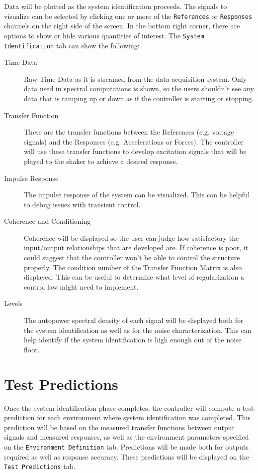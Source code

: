 \documentclass[pdf,12pt,report]{SANDreport}
\newcommand{\inlineCode}{\lstinline[basicstyle=\bfseries\ttfamily]}
\begin{document}
    Data will be plotted as the system identification proceeds.  The signals to visualize can be selected by clicking one or more of the \inlineCode{References} or \inlineCode{Responses} channels on the right side of the screen.  In the bottom right corner, there are options to show or hide various quantities of interest.  The \inlineCode{System Identification} tab can show the following:
    
    \begin{description}
        \item[Time Data] Raw Time Data as it is streamed from the data acquisition system.  Only data used in spectral computations is shown, so the users shouldn't see any data that is ramping up or down as if the controller is starting or stopping.
        \item[Transfer Function] These are the transfer functions between the References (e.g. voltage signals) and the Responses (e.g. Accelerations or Forces).  The controller will use these transfer functions to develop excitation signals that will be played to the shaker to achieve a desired response.
        \item[Impulse Response]  The impulse response of the system can be visualized.  This can be helpful to debug issues with transient control.
        \item[Coherence and Conditioning] Coherence will be displayed so the user can judge how satisfactory the input/output relationships that are developed are.  If coherence is poor, it could suggest that the controller won't be able to control the structure properly.
        The condition number of the Transfer Function Matrix is also displayed.  This can be useful to determine what level of regularization a control law might need to implement.
        \item[Levels] The autopower spectral density of each signal will be displayed both for the system identification as well as for the noise characterization.  This can help identify if the system identification is high enough out of the noise floor.
    \end{description}

    \section{Test Predictions}\label{sec:using_rattlesnake_test_predictions}
    Once the system identification phase completes, the controller will compute a test prediction for each environment where system identification was completed.  This prediction will be based on the measured transfer functions between output signals and measured responses, as well as the environment parameters specified on the \inlineCode{Environment Definition} tab.  Predictions will be made both for outputs required as well as response accuracy.  These predictions will be displayed on the \inlineCode{Test Predictions} tab.
    
\end{document}
